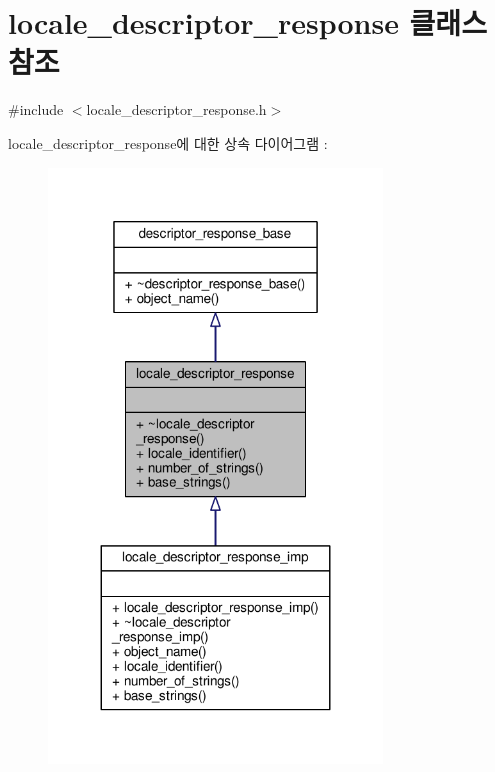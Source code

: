 \hypertarget{classavdecc__lib_1_1locale__descriptor__response}{}\section{locale\+\_\+descriptor\+\_\+response 클래스 참조}
\label{classavdecc__lib_1_1locale__descriptor__response}


{\ttfamily \#include $<$locale\+\_\+descriptor\+\_\+response.\+h$>$}



locale\+\_\+descriptor\+\_\+response에 대한 상속 다이어그램 \+: 
\nopagebreak
\begin{figure}[H]
\begin{center}
\leavevmode
\includegraphics[width=251pt]{classavdecc__lib_1_1locale__descriptor__response__inherit__graph}
\end{center}
\end{figure}


